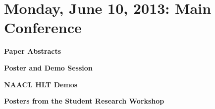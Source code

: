 \chapter{Monday, June 10, 2013: Main Conference}
\thispagestyle{emptyheader}

\newpage
\newpage
\newpage

\vspace{1em}\par\centerline{\bfseries\Large Paper Abstracts}\vspace{1em}\par
{}


\newpage

\vspace{1em}\par\centerline{\bfseries\Large Poster and Demo Session}\vspace{1em}\par
{}

\noindent
\vspace{1em}\par\centerline{\bfseries NAACL HLT Demos}\vspace{1em}\par

\noindent





\noindent
\vspace{1em}\par\centerline{\bfseries Posters from the Student Research Workshop}\vspace{1em}\par

\noindent



